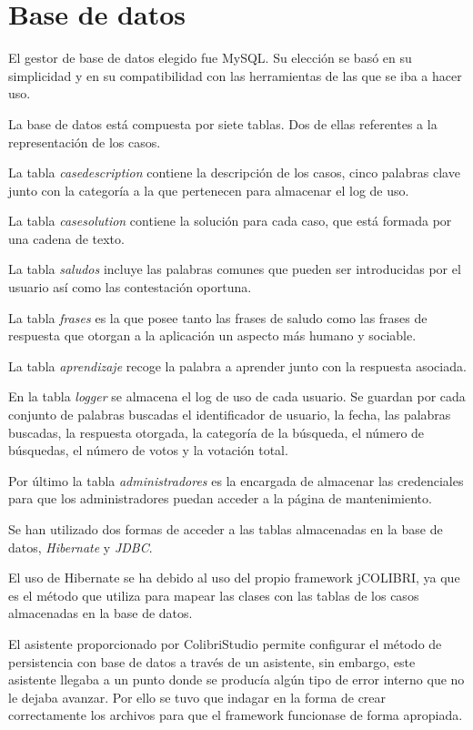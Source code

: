 \section{Base de datos}

El gestor de base de datos elegido fue MySQL. Su elección se basó en su simplicidad y en su compatibilidad con las herramientas de las que se iba a hacer uso.

La base de datos está compuesta por siete tablas. Dos de ellas referentes a la representación de los casos.

La tabla \emph{casedescription} contiene la descripción de los casos, cinco palabras clave junto con la categoría a la que pertenecen para almacenar el log de uso.

La tabla \emph{casesolution} contiene la solución para cada caso, que está formada por una cadena de texto.

La tabla \emph{saludos} incluye las palabras comunes que pueden ser introducidas por el usuario así como las contestación oportuna.

La tabla \emph{frases} es la que posee tanto las frases de saludo como las frases de respuesta que otorgan a la aplicación un aspecto más humano y sociable.

La tabla \emph{aprendizaje} recoge la palabra a aprender junto con la respuesta asociada.

En la tabla \emph{logger} se almacena el log de uso de cada usuario. Se guardan por cada conjunto de palabras buscadas el identificador de usuario, la fecha, las palabras buscadas, la respuesta otorgada, la categoría de la búsqueda, el número de búsquedas, el número de votos y la votación total.

Por último la tabla \emph{administradores} es la encargada de almacenar las credenciales para que los administradores puedan acceder a la página de mantenimiento.

Se han utilizado dos formas de acceder a las tablas almacenadas en la base de datos, \emph{Hibernate} y \emph{JDBC}.

El uso de Hibernate se ha debido al uso del propio framework jCOLIBRI, ya que es el método que utiliza para mapear las clases con las tablas de los casos almacenadas en la base de datos.

El asistente proporcionado por ColibriStudio permite configurar el método de persistencia con base de datos a través de un asistente, sin embargo, este asistente llegaba a un punto donde se producía algún tipo de error interno que no le dejaba avanzar. Por ello se tuvo que indagar en la forma de crear correctamente los archivos para que el framework funcionase de forma apropiada.

